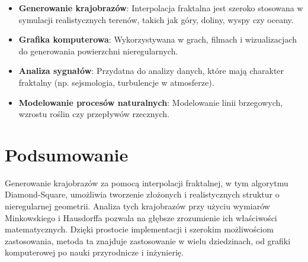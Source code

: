 \documentclass{article}
\begin{document}
\begin{itemize}
    \item \textbf{Generowanie krajobrazów}: Interpolacja fraktalna jest szeroko stosowana w symulacji realistycznych terenów, takich jak góry, doliny, wyspy czy oceany.
    \item \textbf{Grafika komputerowa}: Wykorzystywana w grach, filmach i wizualizacjach do generowania powierzchni nieregularnych.
    \item \textbf{Analiza sygnałów}: Przydatna do analizy danych, które mają charakter fraktalny (np. sejsmologia, turbulencje w atmosferze).
    \item \textbf{Modelowanie procesów naturalnych}: Modelowanie linii brzegowych, wzrostu roślin czy przepływów rzecznych.
\end{itemize}

\vspace{1cm}

\section{Podsumowanie}

Generowanie krajobrazów za pomocą interpolacji fraktalnej, w tym algorytmu Diamond-Square, umożliwia tworzenie złożonych i realistycznych struktur o nieregularnej geometrii. Analiza tych krajobrazów przy użyciu wymiarów Minkowskiego i Hausdorffa pozwala na głębsze zrozumienie ich właściwości matematycznych. Dzięki prostocie implementacji i szerokim możliwościom zastosowania, metoda ta znajduje zastosowanie w wielu dziedzinach, od grafiki komputerowej po nauki przyrodnicze i inżynierię.
\end{document}
